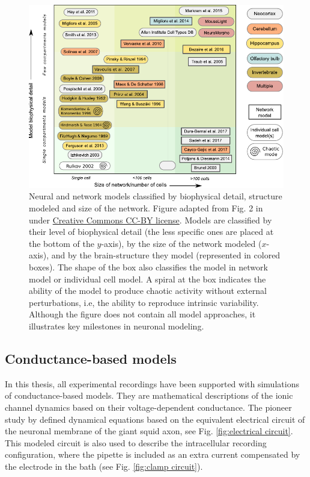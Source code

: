 \begin{figure}[bth!]
	\centering
	\includegraphics[width=\textwidth]{img/intro/models classification_v2.pdf}
	\caption{Neural and network models classified by biophysical detail, structure modeled and size of the network. Figure adapted from Fig. 2 in \textcite{gleeson_open_2019} under \href{http://creativecommons.org/licenses/by/4.0/}{Creative Commons CC-BY license}. Models are classified by their level of biophysical detail (the less specific ones are placed at the bottom of the  $y$-axis), by the size of the network modeled ($x$-axis),  and by the brain-structure they model (represented in colored boxes). The shape of the box also classifies the model in network model or individual cell model. A spiral at the box indicates the ability of the model to produce chaotic activity without external perturbations, i.e, the ability to reproduce intrinsic variability. Although the figure does not contain all model approaches, it illustrates key milestones in neuronal modeling. }
	\label{fig:models-classification}
\end{figure}
\subsection{Conductance-based models}

In this thesis, all experimental recordings have been supported with simulations of conductance-based models. They are  mathematical descriptions of the ionic channel dynamics based on their voltage-dependent conductance. The pioneer study by \textcite{hodgkin_quantitative_1952} defined dynamical equations based on the equivalent electrical circuit of the neuronal membrane of the giant squid axon, see Fig.  \ref{fig:electrical circuit}. This modeled circuit is also used to describe the intracellular recording configuration, where the pipette is included as an extra current compensated by the electrode in the bath (see Fig. \ref{fig:clamp circuit}).

